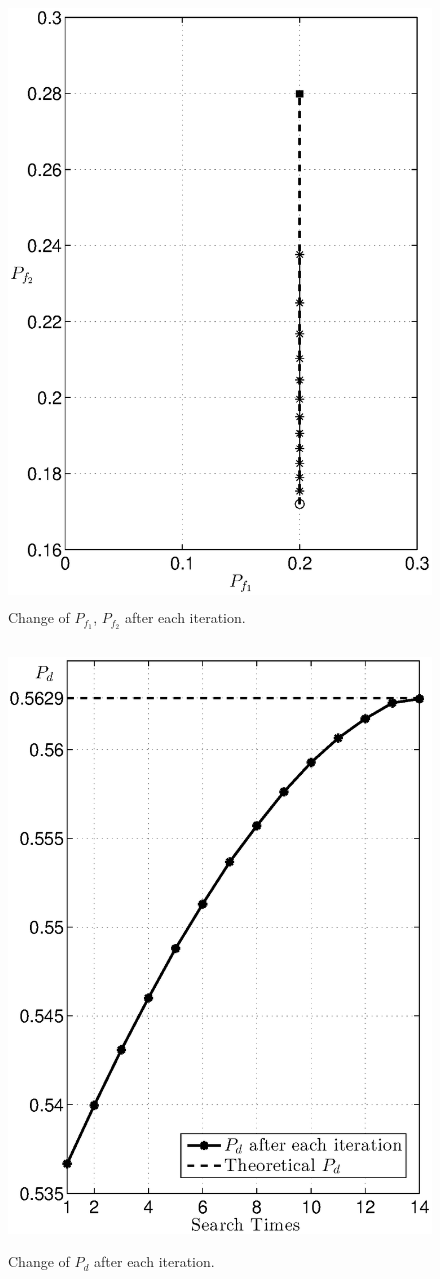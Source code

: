 \begin{figure}[H]
\centering
\includegraphics[width = 12cm , height = 16cm]{2/24pf.eps}
\caption{Change of $P_{f_1}$, $P_{f_2}$ after each iteration.}
\label{fig: 2.4}
\end{figure}
\newpage
\begin{figure}[H]
\centering
\includegraphics[width = 12cm , height = 16cm ]{2/24pd.eps}
\caption{Change of $P_d$ after each iteration.}
\label{fig: 2.5}
\end{figure}
